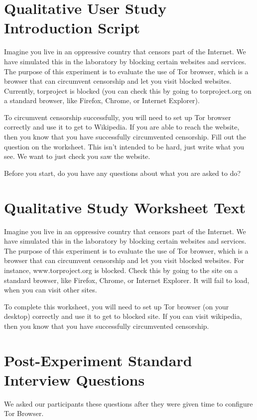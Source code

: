 \documentclass[USenglish,oneside,twocolumn]{article}
\begin{document}
\section{Qualitative User Study Introduction Script} 
\label{qualitative-script} 
Imagine you live in an oppressive country that censors part of the Internet. We have simulated this in the laboratory by blocking certain websites and services.  The purpose of this experiment is to evaluate the use of Tor browser, which is a browser that can circumvent censorship and let you visit blocked websites. Currently, torproject is blocked (you can check this by going to torproject.org on a standard browser, like Firefox, Chrome, or Internet Explorer). 

To circumvent censorship successfully, you will need to set up Tor browser correctly and use it to get to Wikipedia. If you are able to reach the website, then you know that you have successfully circumvented censorship. Fill out the question on the worksheet. This isn't intended to be hard, just write what you see. We want to just check you saw the website. 

Before you start, do you have any questions about what you are asked to do? 

\section{Qualitative Study Worksheet Text} 
\label{participant-worksheet}
Imagine you live in an oppressive country that censors part of the Internet. We have simulated this in the laboratory by blocking certain websites and services. The purpose of this experiment is to evaluate the use of Tor browser, which is a browser that can circumvent censorship and let you visit blocked websites. For instance, www.torproject.org is blocked. Check this by going to the site on a standard browser, like Firefox, Chrome, or Internet Explorer. It will fail to load, when you can visit other sites.

To complete this worksheet, you will need to set up Tor browser (on your desktop) correctly and use it to get to blocked site. If you can visit wikipedia, then you know that you have successfully circumvented censorship.

\section{Post-Experiment Standard Interview Questions}
\label{interview-questions}
We asked our participants these questions after they were given time to configure Tor Browser. \\
\end{document}
